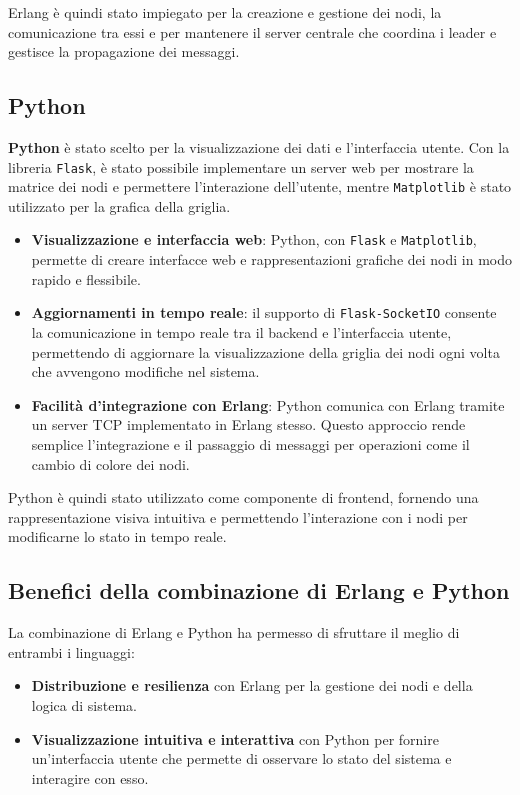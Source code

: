 \documentclass[12pt, a4paper]{report}
\begin{document}
Erlang \`e quindi stato impiegato per la creazione e gestione dei nodi, la comunicazione tra essi e per mantenere il server centrale che coordina i leader e gestisce la propagazione dei messaggi.

\subsection{Python}

\textbf{Python} \`e stato scelto per la visualizzazione dei dati e l’interfaccia utente. Con la libreria \texttt{Flask}, \`e stato possibile implementare un server web per mostrare la matrice dei nodi e permettere l'interazione dell'utente, mentre \texttt{Matplotlib} \`e stato utilizzato per la grafica della griglia.

\newpage
\begin{itemize}
    \item \textbf{Visualizzazione e interfaccia web}: Python, con \texttt{Flask} e \texttt{Matplotlib}, permette di creare interfacce web e rappresentazioni grafiche dei nodi in modo rapido e flessibile.
    \item \textbf{Aggiornamenti in tempo reale}: il supporto di \texttt{Flask-SocketIO} consente la comunicazione in tempo reale tra il backend e l'interfaccia utente, permettendo di aggiornare la visualizzazione della griglia dei nodi ogni volta che avvengono modifiche nel sistema.
    \item \textbf{Facilità d'integrazione con Erlang}: Python comunica con Erlang tramite un server TCP implementato in Erlang stesso. Questo approccio rende semplice l'integrazione e il passaggio di messaggi per operazioni come il cambio di colore dei nodi.
\end{itemize}

Python \`e quindi stato utilizzato come componente di frontend, fornendo una rappresentazione visiva intuitiva e permettendo l'interazione con i nodi per modificarne lo stato in tempo reale.

\subsection{Benefici della combinazione di Erlang e Python}

La combinazione di Erlang e Python ha permesso di sfruttare il meglio di entrambi i linguaggi:
\begin{itemize}
    \item \textbf{Distribuzione e resilienza} con Erlang per la gestione dei nodi e della logica di sistema.
    \item \textbf{Visualizzazione intuitiva e interattiva} con Python per fornire un’interfaccia utente che permette di osservare lo stato del sistema e interagire con esso.
\end{itemize}
\end{document}
